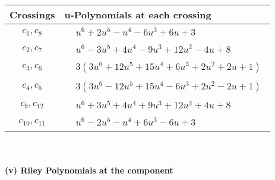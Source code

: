 \documentclass[1p]{elsarticle_modified}
\theoremstyle{definition}
\begin{document}
\begin{tabular}{m{50pt}|m{274pt}}
Crossings & \hspace{64pt}u-Polynomials at each crossing \\
\hline $$\begin{aligned}c_{1},c_{8}\end{aligned}$$&$\begin{aligned}
&u^6+2 u^5- u^4-6 u^3+6 u+3
\end{aligned}$\\
\hline $$\begin{aligned}c_{2},c_{7}\end{aligned}$$&$\begin{aligned}
&u^6-3 u^5+4 u^4-9 u^3+12 u^2-4 u+8
\end{aligned}$\\
\hline $$\begin{aligned}c_{3},c_{6}\end{aligned}$$&$\begin{aligned}
&3(3 u^6+12 u^5+15 u^4+6 u^3+2 u^2+2 u+1)
\end{aligned}$\\
\hline $$\begin{aligned}c_{4},c_{5}\end{aligned}$$&$\begin{aligned}
&3(3 u^6-12 u^5+15 u^4-6 u^3+2 u^2-2 u+1)
\end{aligned}$\\
\hline $$\begin{aligned}c_{9},c_{12}\end{aligned}$$&$\begin{aligned}
&u^6+3 u^5+4 u^4+9 u^3+12 u^2+4 u+8
\end{aligned}$\\
\hline $$\begin{aligned}c_{10},c_{11}\end{aligned}$$&$\begin{aligned}
&u^6-2 u^5- u^4+6 u^3-6 u+3
\end{aligned}$\\
\hline
\end{tabular}\\~\\
\newpage\renewcommand{\arraystretch}{1}
\flushleft \textbf{(v) Riley Polynomials at the component}\newline \\
\end{document}
